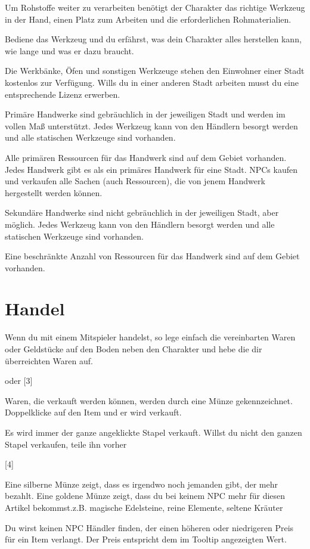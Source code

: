 \documentclass[a4paper,11pt]{book}
\begin{document}
Um Rohstoffe weiter zu verarbeiten benötigt der Charakter das richtige Werkzeug in der Hand, einen Platz zum Arbeiten und die erforderlichen Rohmaterialien.

Bediene das Werkzeug und du erfährst, was dein Charakter alles herstellen kann, wie lange und was er dazu braucht.

Die Werkbänke, Öfen und sonstigen Werkzeuge stehen den Einwohner einer Stadt kostenlos zur Verfügung. Wills du in einer anderen Stadt arbeiten musst du eine entsprechende Lizenz erwerben.

Primäre Handwerke sind gebräuchlich in der jeweiligen Stadt und werden im vollen Maß unterstützt. Jedes Werkzeug kann von den Händlern besorgt werden und alle statischen Werkzeuge sind vorhanden.

Alle primären Ressourcen für das Handwerk sind auf dem Gebiet vorhanden. Jedes Handwerk gibt es als ein primäres Handwerk für eine Stadt. NPCs kaufen und verkaufen alle Sachen (auch Ressourcen), die von jenem Handwerk hergestellt werden können.

Sekundäre Handwerke sind nicht gebräuchlich in der jeweiligen Stadt, aber möglich. Jedes Werkzeug kann von den Händlern besorgt werden und alle statischen Werkzeuge sind vorhanden.

Eine beschränkte Anzahl von Ressourcen für das Handwerk sind auf dem Gebiet vorhanden.

\section{Handel}

Wenn du mit einem Mitspieler handelst, so lege einfach die vereinbarten Waren oder Geldstücke auf den Boden neben den Charakter und hebe die dir überreichten Waren auf.

oder  [3]

Waren, die verkauft werden können, werden durch eine Münze gekennzeichnet. Doppelklicke auf den Item und er wird verkauft.

Es wird immer der ganze angeklickte Stapel verkauft. Willst du nicht den ganzen Stapel verkaufen, teile ihn vorher

[4]

Eine silberne Münze zeigt, dass es irgendwo noch jemanden gibt, der mehr bezahlt. Eine goldene Münze zeigt, dass du bei keinem NPC mehr für diesen Artikel bekommst.z.B. magische Edelsteine, reine Elemente, seltene Kräuter

Du wirst keinen NPC Händler finden, der einen höheren oder niedrigeren Preis für ein Item verlangt. Der Preis entspricht dem im Tooltip angezeigten Wert. 
\end{document}
